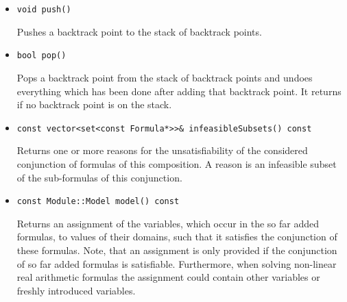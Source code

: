 \begin{itemize}
    \item \begin{verbatim}void push()\end{verbatim}
    	Pushes a backtrack point to the stack of backtrack points.
    \item \begin{verbatim}bool pop()\end{verbatim}
    	Pops a backtrack point from the stack of backtrack points and undoes everything
		which has been done after adding that backtrack point. It returns \false if no backtrack
		point is on the stack.
    \item \begin{verbatim}const vector<set<const Formula*>>& infeasibleSubsets() const\end{verbatim}
    	Returns one or more reasons for the unsatisfiability of the considered conjunction of 
    	formulas of this \smtrat composition. A reason
    	is an infeasible subset of the sub-formulas of this conjunction.
    \item \begin{verbatim}const Module::Model model() const\end{verbatim}
    	Returns an assignment of the variables, which occur in the so far added
        formulas, to values of their domains, such that it satisfies the 
        conjunction of these formulas. Note, that an assignment is only provided if the conjunction of so far added
        formulas is satisfiable. Furthermore, when solving non-linear real arithmetic 
        formulas the assignment could contain other variables or freshly introduced
        variables.
\end{itemize}

